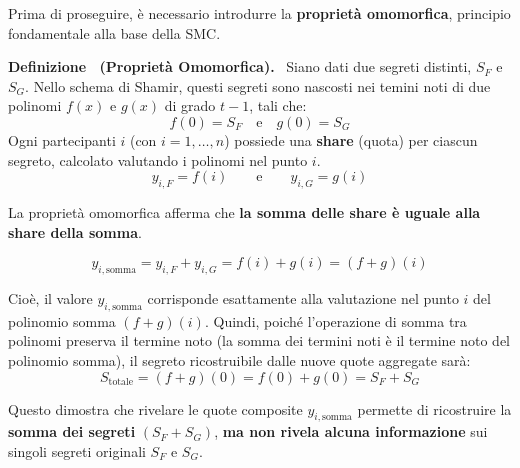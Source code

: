 \documentclass[a4paper, 11pt]{article}
\newenvironment{definition}[1][]{
  \par\noindent\textbf{Definizione%
  \if\relax\detokenize{#1}\relax\else\ (\textbf{#1})\fi.}\ }{}
\begin{document}
Prima di proseguire, è necessario introdurre la \textbf{proprietà omomorfica}, principio fondamentale alla base della SMC.

\begin{definition}[Proprietà Omomorfica]
    Siano dati due segreti distinti, $S_F$ e $S_G$. Nello schema di Shamir, questi segreti sono nascosti nei temini noti di due polinomi $f(x)$ e $g(x)$ di grado $t - 1$, tali che:
    \[
    f(0) = S_F \quad \text{e} \quad g(0) = S_G
    \]
    Ogni partecipanti $i$ (con $i = 1, \dots, n$) possiede una \textbf{share} (quota) per ciascun segreto, calcolato valutando i polinomi nel punto $i$.
    \[
    y_{i, F} = f(i) \qquad \text{e} \qquad y_{i, G} = g(i)
    \]

    La proprietà omomorfica afferma che \textbf{la somma delle share è uguale alla share della somma}.
    
    \[
    y_{i,\text{somma}} = y_{i, F} + y_{i, G} = f(i) + g(i) = (f + g)(i)
    \]

    Cioè, il valore $y_{i,\text{somma}}$ corrisponde esattamente alla valutazione nel punto $i$ del polinomio somma $(f + g)(i)$. Quindi, poiché l'operazione di somma tra polinomi preserva il termine noto (la somma dei termini noti è il termine noto del polinomio somma), il segreto ricostruibile dalle nuove quote aggregate sarà:
    \[
    S_{\text{totale}} = (f + g)(0) = f(0) + g(0) = S_F + S_G 
    \]

    Questo dimostra che rivelare le quote composite $y_{i,\text{somma}}$ permette di ricostruire la \textbf{somma dei segreti} $(S_F + S_G)$, \textbf{ma non rivela alcuna informazione} sui singoli segreti originali $S_F$ e $S_G$.
\end{definition}

\newpage
\end{document}
